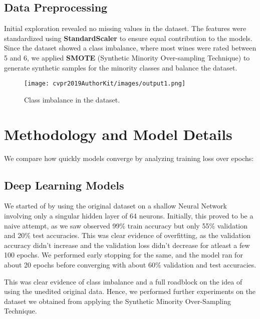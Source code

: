 \documentclass[10pt,twocolumn,letterpaper]{article}
\begin{document}
\subsection{Data Preprocessing}
Initial exploration revealed no missing values in the dataset. The features were standardized using \textbf{StandardScaler} to ensure equal contribution to the models. Since the dataset showed a class imbalance, where most wines were rated between 5 and 6, we applied \textbf{SMOTE} (Synthetic Minority Over-sampling Technique) to generate synthetic samples for the minority classes and balance the dataset.

\begin{figure}[h]
    \centering
    \texttt{[image: cvpr2019AuthorKit/images/output1.png]}
    \caption{Class imbalance in the dataset.}
\end{figure}


\section{Methodology and Model Details}

We compare how quickly models converge by analyzing training loss over epochs:

\subsection{Deep Learning Models}

We started of by using the original dataset on a shallow Neural Network involving only a singular hidden layer of  64 neurons. Initially, this proved to be a naive attempt, as we saw observed 99\% train accuracy but only 55\% validation and 20\% test accuracies. This was clear evidence of overfitting, as the validation accuracy didn't increase and the validation loss didn't decrease for atleast a few 100 epochs. We performed early stopping for the same, and the model ran for about 20 epochs before converging with about 60\% validation and test accuracies. 

This was clear evidence of class imbalance and a full roadblock  on the idea of using the unedited original data. Hence, we performed further experiments on the dataset we obtained from applying the Synthetic Minority Over-Sampling Technique. 
\end{document}
